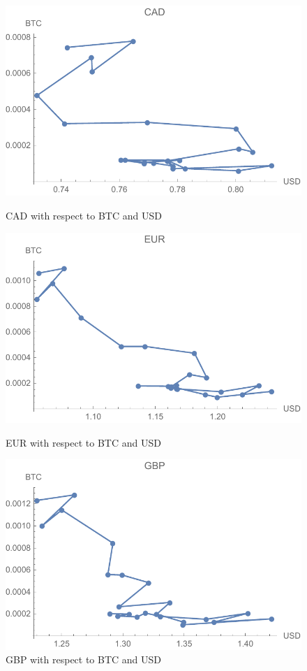 \begin{figure}[!htb]
	\includegraphics[width=\linewidth]{figures/cad.pdf}
	\caption{CAD with respect to BTC and USD}\label{fig:cad}
	\endminipage\hfill
	\includegraphics[width=\linewidth]{figures/eur.pdf}
	\caption{EUR with respect to BTC and USD}\label{fig:eur}
	\endminipage\hfill
	\includegraphics[width=\linewidth]{figures/gbp.pdf}
	\caption{GBP with respect to BTC and USD}\label{fig:gbp}
	\endminipage
\end{figure}

